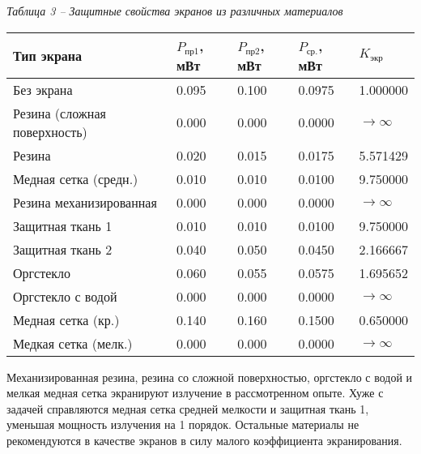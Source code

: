 \noindent\textit{Таблица 3 -- Защитные свойства экранов из различных материалов}
\begin{longtable}{|p{5cm}|p{2.5cm}|p{2.5cm}|p{2.5cm}|p{2.5cm}|}
    \hline
    Тип экрана                   & $P_\text{пр1}$, мВт & $P_\text{пр2}$, мВт & $P_\text{ср.}$, мВт & $K_{\text{экр}}$ \\\hline
    Без экрана                   & 0.095               & 0.100               & 0.0975              & 1.000000         \\\hline
    Резина (сложная поверхность) & 0.000               & 0.000               & 0.0000              & $\to \infty$     \\\hline
    Резина                       & 0.020               & 0.015               & 0.0175              & 5.571429         \\\hline
    Медная сетка (средн.)        & 0.010               & 0.010               & 0.0100              & 9.750000         \\\hline
    Резина механизированная      & 0.000               & 0.000               & 0.0000              & $\to \infty$     \\\hline
    Защитная ткань 1             & 0.010               & 0.010               & 0.0100              & 9.750000         \\\hline
    Защитная ткань 2             & 0.040               & 0.050               & 0.0450              & 2.166667         \\\hline
    Оргстекло                    & 0.060               & 0.055               & 0.0575              & 1.695652         \\\hline
    Оргстекло с водой            & 0.000               & 0.000               & 0.0000              & $\to \infty$     \\\hline
    Медная сетка (кр.)           & 0.140               & 0.160               & 0.1500              & 0.650000         \\\hline
    Медкая сетка (мелк.)         & 0.000               & 0.000               & 0.0000              & $\to \infty$     \\\hline
\end{longtable}

Механизированная резина, резина со сложной поверхностью, оргстекло с водой и мелкая медная сетка экранируют
излучение в рассмотренном опыте.
Хуже с задачей справляются медная сетка средней мелкости и защитная ткань 1, уменьшая мощность излучения на 1 порядок.
Остальные материалы не рекомендуются в качестве экранов в силу малого
коэффициента экранирования.

